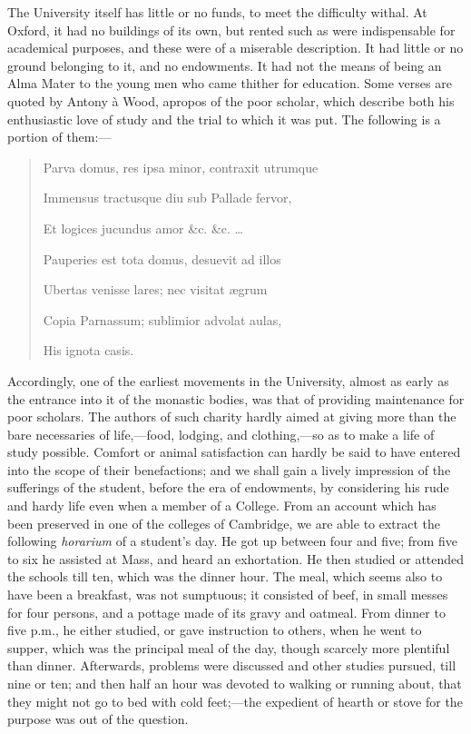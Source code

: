 The University itself has
little or no funds, to meet the difficulty withal. At Oxford, it had
no buildings of its own, but rented such as were indispensable for
academical purposes, and these were of a miserable description. It had
little or no ground belonging to it, and no endowments. It had not the
means of being an Alma Mater to the young men who came thither for
education. Some verses are quoted by Antony à Wood, apropos of the
poor scholar, which describe both his enthusiastic love of study and
the trial to which it was put. The following is a portion of them:—

\begin{quote}

Parva domus, res ipsa minor,
contraxit utrumque

Immensus tractusque diu sub Pallade fervor,

Et logices jucundus amor \&c. \&c. …

Pauperies est tota domus, desuevit ad illos

Ubertas venisse lares; nec visitat ægrum

Copia Parnassum; sublimior advolat aulas,

His ignota casis.

\end{quote}

Accordingly, one of the
earliest movements in the University, almost as early as the entrance
into it of the monastic bodies, was that of providing maintenance for
poor scholars. The authors of such charity hardly aimed at giving more
than the bare necessaries of life,—food, lodging, and clothing,—so
as to make a life of study possible. Comfort or animal satisfaction
can hardly be said to have entered into the scope of their
benefactions; and we shall gain a lively impression of the sufferings
of the student, before the era of endowments, by considering his rude
and hardy life even when a member of a College. From an account which
has been preserved in one of the colleges of Cambridge, we are able to
extract the following \emph{horarium} of a student's day. He got up
between four and five; from five to six he assisted at Mass, and heard
an exhortation. He then studied or attended the schools till ten,
which was the dinner hour. The meal, which seems also to have been a
breakfast, was not sumptuous; it consisted of beef, in small messes
for four persons, and a pottage made of its gravy and oatmeal. From
dinner to five p.m., he either studied, or gave instruction to others,
when he went to supper, which was the principal meal of the day,
though scarcely more plentiful than dinner. Afterwards, problems were
discussed and other studies pursued, till nine or ten; and then half
an hour was devoted to walking or running about, that they might not
go to bed with cold feet;—the expedient of hearth or stove for the
purpose was out of the question.

